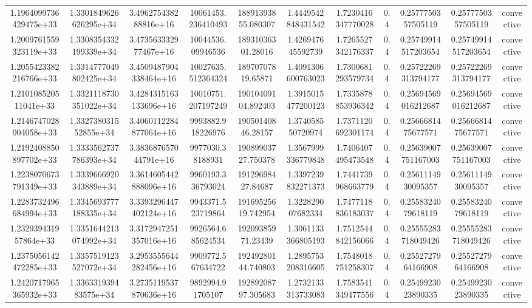 \begin{table}
\begin{tabular}{ccccccccccc}
1.1964099736429475e+33 & 1.3301849626626295e+34 & 3.496275438288816e+16 & 10061453.236410493 & 18891393855.080307 & 1.4449542848431542 & 1.7230416347770028 & 0.4 & 0.2577750357505119 & 0.2577750357505119 & convective \\
1.2009761559323119e+33 & 1.3308354332199339e+34 & 3.473563332977467e+16 & 10044536.09946536 & 18931036301.28016 & 1.426947645592739 & 1.7265527342176337 & 0.4 & 0.25749914517203654 & 0.25749914517203654 & convective \\
1.2055423382216766e+33 & 1.3314777049802425e+34 & 3.4509487904338464e+16 & 10027635.512364324 & 18970707819.65871 & 1.4091306600763023 & 1.7300681293579734 & 0.4 & 0.25722269313794177 & 0.25722269313794177 & convective \\
1.210108520511041e+33 & 1.3321118730351022e+34 & 3.4284315163133696e+16 & 10010751.207197249 & 19010409104.892403 & 1.3915015477200123 & 1.7335878853936342 & 0.4 & 0.25694569016212687 & 0.25694569016212687 & convective \\
1.2146747028004058e+33 & 1.332738031552855e+34 & 3.4060112284877064e+16 & 9993882.918226976 & 19050140846.28157 & 1.374058550720974 & 1.7371120692301174 & 0.4 & 0.2566681475677571 & 0.2566681475677571 & convective \\
1.2192408850897702e+33 & 1.3333562737786393e+34 & 3.383687657044791e+16 & 9977030.38188931 & 19089903727.750378 & 1.3567999336779848 & 1.7406407495473548 & 0.4 & 0.25639007751167003 & 0.25639007751167003 & convective \\
1.2238070673791349e+33 & 1.3339666920343889e+34 & 3.3614605442888096e+16 & 9960193.336793024 & 19129698427.84687 & 1.3397239832271373 & 1.7441739968663779 & 0.4 & 0.2561114930095357 & 0.2561114930095357 & convective \\
1.2283732496684994e+33 & 1.3345693777188335e+34 & 3.3393296447402124e+16 & 9943371.523719864 & 19169525619.742954 & 1.322829007682334 & 1.7477118836183037 & 0.4 & 0.2558324079618119 & 0.2558324079618119 & convective \\
1.232939431957864e+33 & 1.3351644213074992e+34 & 3.3172947251357016e+16 & 9926564.685624534 & 19209385971.23439 & 1.3061133366805193 & 1.7512544842156066 & 0.4 & 0.25555283718049426 & 0.25555283718049426 & convective \\
1.2375056142472285e+33 & 1.3357519123527072e+34 & 3.2953555644282456e+16 & 9909772.567634722 & 19249280144.740803 & 1.2895753208316605 & 1.7548018751258307 & 0.4 & 0.2552727964166908 & 0.2552727964166908 & convective \\
1.2420717965365932e+33 & 1.336331939483575e+34 & 3.2735119537870636e+16 & 9892994.91705107 & 19289208797.305683 & 1.2732133313733083 & 1.7583541349477556 & 0.4 & 0.2549923023890335 & 0.2549923023890335 & convective \\

\end{tabular}
\end{table}
